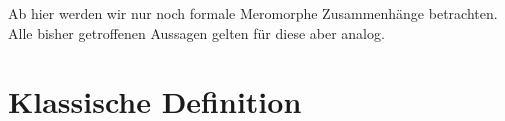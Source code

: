 \begin{comment}
  Quellen:\\
  sabbah\_cimpa90 seite 28 / 30
\end{comment}

Ab hier werden wir nur noch formale Meromorphe Zusammenhänge betrachten. Alle
bisher getroffenen Aussagen gelten für diese aber analog.

\begin{comment}
  Sei $M_{\hat{K}}=\cD_{\hat{K}}/\cD_{\hat{K}}\cdot P$ und nehme an, dass $N(P)$
  zumindes 2 nichttriviale Steigungen hat. Spalte $N(P)=N_1\dot\cup N_2$ in 2
  Teile. Dann gilt:

  \begin{lem}
    Es existiert eine Aufteilung $P=P_1P_2$ mit:
    \begin{itemize}
      \item $N(P_1)\subset N_1$ und $N(P_2)\subset N_2$
      \item A ist eine kante von ...
    \end{itemize}
  \end{lem}
\end{comment}

\section{Klassische Definition}

